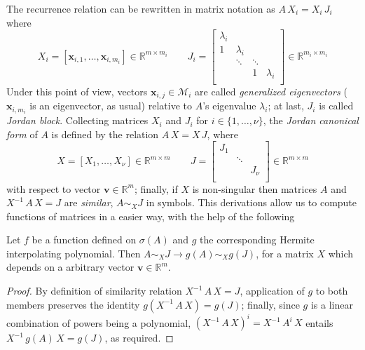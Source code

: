 The recurrence relation can be rewritten in matrix notation as $A\,X_{i} = X_{i}\,J_{i}$ where
\begin{displaymath}
X_{i} = \left[\boldsymbol{x}_{i,1},\ldots,\boldsymbol{x}_{i,m_{i}} \right]\in\mathbb{R}^{m\times m_{i}} \quad\quad
J_{i} = \left[ \begin{array}{cccc}
    \lambda_{i} \\
    1 & \lambda_{i} \\
      & \ddots & \ddots \\
      & & 1 &\lambda_{i} \\
\end{array} \right] \in\mathbb{R}^{m_{i}\times m_{i}}
\end{displaymath}
Under this point of view, vectors $\boldsymbol{x}_{i,j}\in\mathcal{M}_{i}$ are
called \textit{generalized eigenvectors} ($\boldsymbol{x}_{i,m_{i}}$ is an
eigenvector, as usual) relative to $A$'s eigenvalue $\lambda_{i}$; at last,
$J_{i}$ is called \textit{Jordan block}.  Collecting matrices $X_{i}$ and
$J_{i}$ for $i\in \lbrace 1,\ldots,\nu \rbrace$, the \textit{Jordan canonical
form} of $A$ is defined by the relation $A\,X = X\, J$, where
\begin{displaymath}
X = \left[X_{1},\ldots,X_{\nu} \right]\in\mathbb{R}^{m\times m} \quad\quad
J = \left[ \begin{array}{ccc}
    J_{1} \\
      & \ddots \\
      & & J_{\nu} \\
\end{array} \right] \in\mathbb{R}^{m\times m}
\end{displaymath}
with respect to vector $\boldsymbol{v}\in\mathbb{R}^{m}$; finally, if $X$ is
non-singular then matrices $A$ and $X^{-1}\,A\,X = J$ are \textit{similar}, $A
\sim_{X} J$ in symbols. This derivations allow us to compute functions of
matrices in a easier way, with the help of the following 
\begin{lemma} Let $f$ be a function defined on $\sigma(A)$ and $g$ the 
corresponding Hermite interpolating polynomial. Then $ A \sim_{X} J \rightarrow
g(A) \sim_{X} g(J) $, for a matrix $X$ which depends on a arbitrary vector
$\boldsymbol{v}\in\mathbb{R}^{m}$.
\end{lemma}
\begin{proof}
By definition of similarity relation $ X^{-1}\,A\,X = J$, application of $g$ to
both members preserves the identity $ g(X^{-1}\,A\,X) = g(J)$; finally, since
$g$ is a linear combination of powers being a polynomial,
$\left(X^{-1}\,A\,X\right)^{i} = X^{-1}\,A^{i}\,X$ entails $X^{-1}\,g(A)\,X =
g(J)$, as required.
\end{proof}
